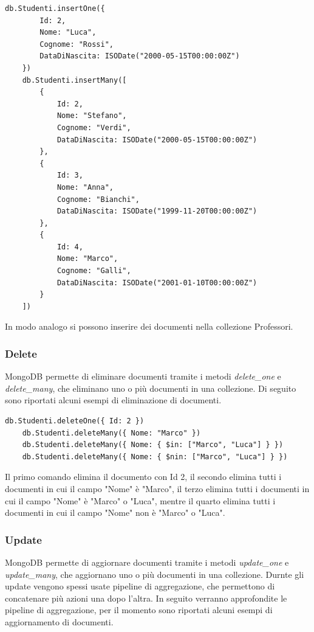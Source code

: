 \documentclass{article}
\begin{document}
\begin{lstlisting}[language=MongoDBShell, caption={Esempio di insert in MongoDB}]
    db.Studenti.insertOne({
        Id: 2,
        Nome: "Luca",
        Cognome: "Rossi",
        DataDiNascita: ISODate("2000-05-15T00:00:00Z")
    })
    db.Studenti.insertMany([
        {
            Id: 2,
            Nome: "Stefano",
            Cognome: "Verdi",
            DataDiNascita: ISODate("2000-05-15T00:00:00Z")
        },
        {
            Id: 3,
            Nome: "Anna",
            Cognome: "Bianchi",
            DataDiNascita: ISODate("1999-11-20T00:00:00Z")
        },
        {
            Id: 4,
            Nome: "Marco",
            Cognome: "Galli",
            DataDiNascita: ISODate("2001-01-10T00:00:00Z")
        }
    ])

\end{lstlisting}
In modo analogo si possono inserire dei documenti nella collezione Professori.

\subsubsection{Delete}
MongoDB permette di eliminare documenti tramite i metodi \textit{delete\_one} e \textit{delete\_many}, che eliminano uno
o più documenti in una collezione. Di seguito sono riportati alcuni esempi di eliminazione di documenti.

\begin{lstlisting}[language=MongoDBShell, caption={Esempio di delete in MongoDB}]
    db.Studenti.deleteOne({ Id: 2 })
    db.Studenti.deleteMany({ Nome: "Marco" })
    db.Studenti.deleteMany({ Nome: { $in: ["Marco", "Luca"] } })
    db.Studenti.deleteMany({ Nome: { $nin: ["Marco", "Luca"] } })

\end{lstlisting}
Il primo comando elimina il documento con Id 2, il secondo elimina tutti i documenti in cui il campo "Nome" è "Marco", il terzo elimina
tutti i documenti in cui il campo "Nome" è "Marco" o "Luca", mentre il quarto elimina tutti i documenti in cui il campo "Nome" non è "Marco" o "Luca".

\subsubsection{Update}

MongoDB permette di aggiornare documenti tramite i metodi \textit{update\_one} e \textit{update\_many}, che aggiornano uno
o più documenti in una collezione. Durnte gli update vengono spessi usate pipeline di aggregazione, che permettono di concatenare
più azioni una dopo l'altra. In seguito verranno approfondite le pipeline di aggregazione, per il momento sono riportati alcuni
esempi di aggiornamento di documenti.
\end{document}
